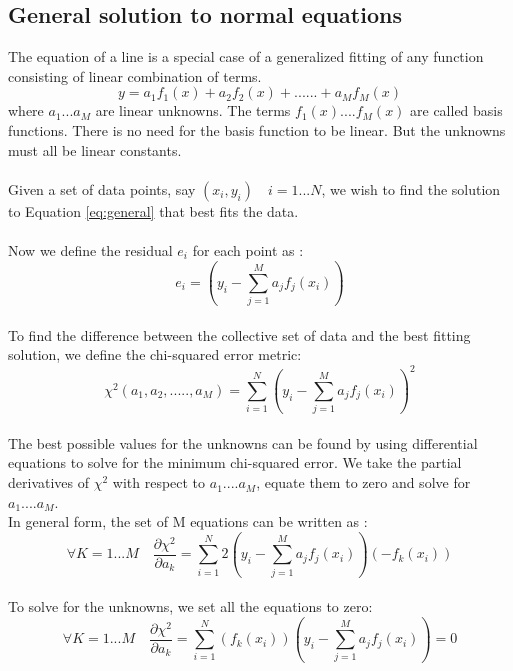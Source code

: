 \documentclass[12pt]{article}
\begin{document}
\subsection{General solution to normal equations} \label{ss:general}
The equation of a line is a special case of a generalized fitting of any function consisting of linear combination of terms. 
\begin{equation}
 y = a_1 f_1 (x) + a_2 f_2 (x) + ...... + a_M f_M (x)
\label{eq:general}
\end{equation}
where $a_1 ... a_M$ are linear unknowns. The terms $f_1(x) .... f_M(x)$ are called basis functions. There is no need for the basis function to be linear. But the unknowns must all be linear constants. \\
\\
Given a set of data points, say $(x_i , y_i) \quad i = 1...N$, we wish to find the solution to Equation \ref{eq:general} that best fits the data.  \\
\\
Now we define the residual $e_i$ for each point as :
\begin{equation}
e_i = \left(y_i - \sum_{j = 1}^M a_j f_j (x_i)\right)
\end{equation}\\
To find the difference between the collective set of data and the best fitting solution, we define the chi-squared error metric:
\begin{equation}
\chi^2 (a_1, a_2, ....., a_M) = \sum_{i = 1}^N \left(y_i - \sum_{j = 1}^M a_j f_j (x_i)\right)^2
\end{equation}\\
The best possible values for the unknowns can be found by using differential equations to solve for the minimum chi-squared error. We take the partial derivatives of $\chi^2$ with respect to $a_1....a_M$, equate them to zero and solve for $a_1....a_M$. \\
In general form, the set of M equations can be written as :
\begin{equation}
\forall K = 1...M \quad  \frac{\partial \chi^2}{\partial a_k} = \sum_{i = 1}^N 2 \left(y_i - \sum_{j = 1}^M a_j f_j (x_i)\right) (-f_k(x_i))
\end{equation}\\
To solve for the unknowns, we set all the equations to zero: 
\begin{equation}
\forall K = 1...M \quad  \frac{\partial \chi^2}{\partial a_k} = \sum_{i = 1}^N (f_k(x_i))\left(y_i - \sum_{j = 1}^M a_j f_j (x_i)\right) = 0
\end{equation}\\
\end{document}
